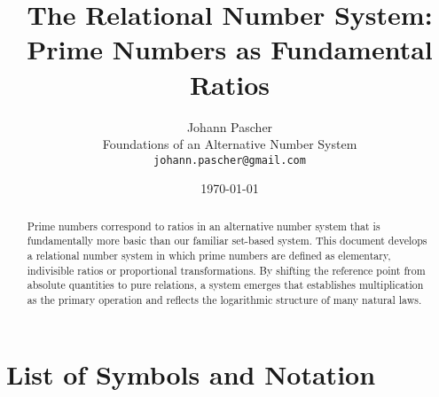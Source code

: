 \documentclass[11pt,a4paper]{article}
\title{The Relational Number System:\\
	Prime Numbers as Fundamental Ratios}
\author{Johann Pascher\\
	Foundations of an Alternative Number System\\
	\texttt{johann.pascher@gmail.com}}
\date{\today}
\begin{document}
	
	\maketitle
	
	\begin{abstract}
		Prime numbers correspond to ratios in an alternative number system that is fundamentally more basic than our familiar set-based system. This document develops a relational number system in which prime numbers are defined as elementary, indivisible ratios or proportional transformations. By shifting the reference point from absolute quantities to pure relations, a system emerges that establishes multiplication as the primary operation and reflects the logarithmic structure of many natural laws.
	\end{abstract}
	
	\tableofcontents
	\newpage
	
	\section{List of Symbols and Notation}
	
\end{document}
